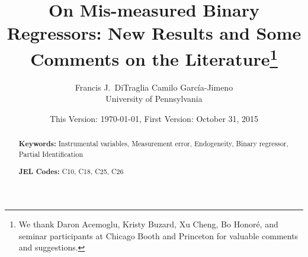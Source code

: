 \documentclass[12pt]{article}
\title{On Mis-measured Binary Regressors: New Results and Some Comments on the Literature\footnote{We thank Daron Acemoglu, Kristy Buzard, Xu Cheng, Bo Honor\'{e}, and seminar participants at Chicago Booth and Princeton for valuable comments and suggestions.}}
\author{Francis J.\ DiTraglia  \hspace{2em} Camilo Garc\'{i}a-Jimeno\\
\normalsize University of Pennsylvania}
\date{\small This Version: \today, First Version: October 31, 2015}
\begin{document}
\maketitle


\begin{abstract}
  \singlespacing
	

  	\bigskip
	\noindent\textbf{Keywords:} Instrumental variables, Measurement error, Endogeneity, Binary regressor, Partial Identification

	\medskip
  \noindent\textbf{JEL Codes:} C10, C18, C25, C26
\end{abstract}

\newpage









\appendix




\end{document}

